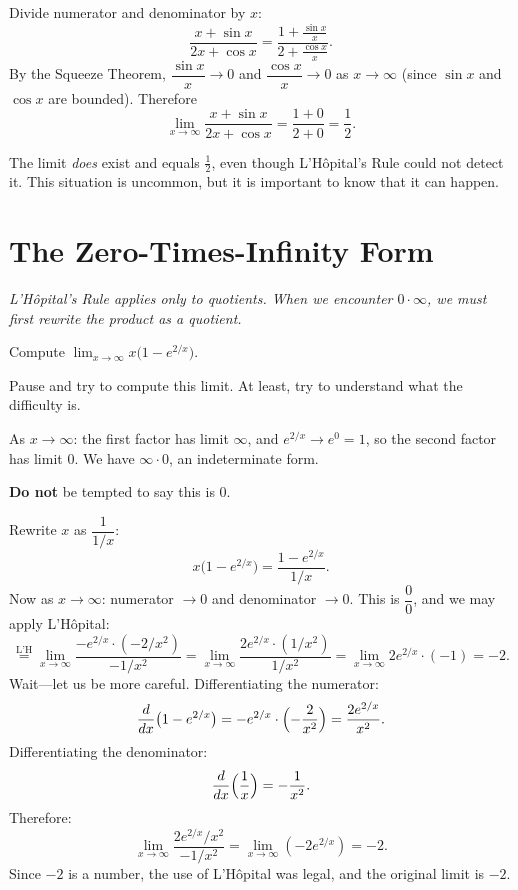 Divide numerator and denominator by $x$:
\[
  \frac{x + \sin x}{2x + \cos x} = \frac{1 + \frac{\sin x}{x}}{2 + \frac{\cos x}{x}}.
\]
By the Squeeze Theorem, $\dfrac{\sin x}{x} \to 0$ and $\dfrac{\cos x}{x} \to 0$ as $x \to \infty$ (since $\sin x$ and $\cos x$ are bounded).  Therefore
\[
  \lim_{x \to \infty}\frac{x + \sin x}{2x + \cos x} = \frac{1 + 0}{2 + 0} = \frac{1}{2}.
\]

\begin{remark}[Warning]
The limit \emph{does} exist and equals $\frac{1}{2}$, even though L'H\^opital's Rule could not detect it.  This situation is uncommon, but it is important to know that it can happen.
\end{remark}

\section{The Zero-Times-Infinity Form}
\label{sec:6.9}

\textit{L'H\^opital's Rule applies only to quotients.  When we encounter $0\cdot\infty$, we must first rewrite the product as a quotient.}

\begin{example}
\label{ex:6-10}
Compute $\displaystyle\lim_{x \to \infty} x\bigl(1 - e^{2/x}\bigr)$.

\begin{remark}
Pause and try to compute this limit.  At least, try to understand what the difficulty is.
\end{remark}

As $x \to \infty$: the first factor has limit $\infty$, and $e^{2/x} \to e^{0} = 1$, so the second factor has limit $0$.  We have $\infty \cdot 0$, an indeterminate form.

\textbf{Do not} be tempted to say this is $0$.

Rewrite $x$ as $\dfrac{1}{1/x}$:
\[
  x\bigl(1 - e^{2/x}\bigr) = \frac{1 - e^{2/x}}{1/x}.
\]
Now as $x \to \infty$: numerator $\to 0$ and denominator $\to 0$.  This is $\dfrac{0}{0}$, and we may apply L'H\^opital:
\[
  \stackrel{\text{L'H}}{=} \lim_{x \to \infty}\frac{-e^{2/x}\cdot(-2/x^{2})}{-1/x^{2}} = \lim_{x \to \infty}\frac{2e^{2/x}\cdot(1/x^{2})}{1/x^{2}} = \lim_{x \to \infty} 2e^{2/x}\cdot(-1) = -2.
\]
Wait---let us be more careful.  Differentiating the numerator:
\[
  \frac{d}{dx}\bigl(1 - e^{2/x}\bigr) = -e^{2/x}\cdot\Bigl(-\frac{2}{x^{2}}\Bigr) = \frac{2e^{2/x}}{x^{2}}.
\]
Differentiating the denominator:
\[
  \frac{d}{dx}\Bigl(\frac{1}{x}\Bigr) = -\frac{1}{x^{2}}.
\]
Therefore:
\[
  \lim_{x \to \infty}\frac{2e^{2/x}/x^{2}}{-1/x^{2}} = \lim_{x \to \infty}(-2e^{2/x}) = -2.
\]
Since $-2$ is a number, the use of L'H\^opital was legal, and the original limit is $-2$.
\end{example}

